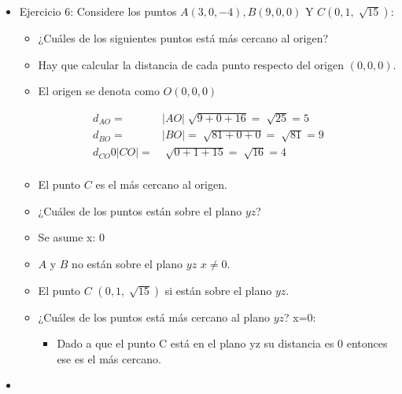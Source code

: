 \begin{itemize}
    \item Ejercicio 6: Considere los puntos $A(3,0,-4),B(9,0,0)$ Y $C(0,1,\sqrt[]{15})$:    
        \begin{itemize}
            \item ¿Cuáles de los siguientes puntos está más cercano al origen?
            \item Hay que calcular la distancia de cada punto respecto del origen $(0,0,0)$.
            \item El origen se denota como $O(0,0,0)$
        \end{itemize}
        \begin{center}
           \begin{align*}
               d_{AO} =& \left| AO \right| \sqrt[]{9+0+16}=\sqrt[]{25}=5 \\ 
               d_{BO} =& \left| BO \right|= \sqrt[]{81+0+0} = \sqrt[]{81} = 9 \\ 
                d_{CO} 0 \left| CO \right| =& \sqrt[]{0+1+15} = \sqrt[]{16}=4 \\ 
           \end{align*}
        \end{center}
        \begin{itemize}
            \item El punto $C$ es el más cercano al origen.
        \end{itemize}
        \begin{itemize}
            \item ¿Cuáles de los puntos están sobre el plano $yz$? 
            \item Se asume x: 0
            \item $A$ y $B$ no están sobre el plano $yz$ $x\neq 0$.
            \item El punto $C$ $(0,1,\sqrt[]{15})$ si están sobre el plano $yz$.
            \item ¿Cuáles de los puntos está más cercano al plano $yz$? x=0:
                \begin{itemize}
                    \item Dado a que el punto C está en el plano yz su distancia es 0 entonces ese es el más cercano.
                \end{itemize}
        \end{itemize}
    
    \item 
\end{itemize}













